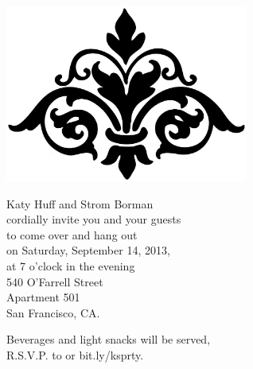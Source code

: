 \documentclass{letter}[12pt]
\newcommand*\initfamily{\usefont{U}{ArtNouvc}{xl}{n}}
\begin{document}
\begin{letter}{}
   \begin{center}
     \includegraphics[width=8cm]{flourish.eps}

     \vspace{1cm}

\Large
{\Huge K}aty {\Huge H}uff and {\Huge S}trom {\Huge B}orman\\
     cordially invite you and your guests\\
     to come over and hang out\\
     on Saturday, September 14, 2013,\\
     at 7 o'clock in the evening\\
     540 O'Farrell Street \\ Apartment 501 \\ San Francisco, CA.\\

     \vspace{1cm}

     Beverages and light snacks will be served,\\
     R.S.V.P. to  or bit.ly/ksprty.

   \end{center}

       \end{letter}
       
\end{document}
